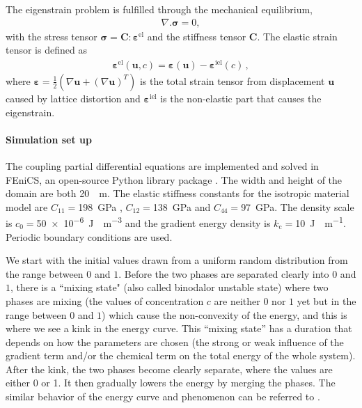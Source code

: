 \documentclass[11pt, authoryear]{elsarticle}
\begin{document}
\begin{appendix}
		The eigenstrain problem is fulfilled through the mechanical equilibrium,
		\begin{align}
			\label{eq:mech_equi}
			\nabla . \boldsymbol{\sigma} = 0,
		\end{align}
		with the stress tensor $\boldsymbol{\sigma} = \boldsymbol{C}:\boldsymbol{\varepsilon}^{\mathrm{el}}$ 
		and the stiffness tensor $\boldsymbol{C}$. The elastic strain tensor is defined as
		\begin{align}
			\label{eq:elastic_strain_tensor}
			\boldsymbol{\varepsilon}^{\mathrm{el}}(\boldsymbol{u}, c) = \boldsymbol{\varepsilon}(\boldsymbol{u}) - \boldsymbol{\varepsilon}^{\mathrm{iel}}(c)\,,
		\end{align}
		where $\boldsymbol{\varepsilon} = \frac{1}{2}(\nabla \boldsymbol{u} + (\nabla \boldsymbol{u})^T)$ is the total strain tensor from displacement $\boldsymbol{u}$ caused by lattice distortion and  $\boldsymbol{\varepsilon}^{\mathrm{iel}}$ is the non-elastic part that causes the eigenstrain.
		
		\paragraph{Simulation set up}
		The coupling partial differential equations are implemented and solved in FEniCS, an open-source Python library package \citep{LangtangenLogg2017}. The width and height of the domain are both \SI{20}{\mu\m}. The elastic stiffness constants for the isotropic material model are $C_\mathrm{11}=$\SI{198}{\GPa} , $C_\mathrm{12}=$\SI{138}{\GPa} and $C_\mathrm{44}=$\SI{97}{\GPa}. The density scale is $c_\mathrm{0}=$\SI{50e-6}{\J\mu \m^{-3}} and the gradient energy density is $k_\mathrm{c}=$\SI{10}{\J\mu \m^{-1}}. Periodic boundary conditions are used.
		
		
		We start with the initial values drawn from a uniform random distribution from the range between $0$ and $1$. Before the two phases are separated clearly into $0$ and $1$, there is a “mixing state" (also called  binodalor unstable state) where two phases are mixing (the values of concentration $c$ are neither $0$ nor $1$ yet but in the range between $0$ and $1$) which cause the non-convexity of the energy, and this is where we see a kink in the energy curve. This “mixing state” has a duration that depends on how the parameters are chosen (the strong or weak influence of the gradient term and/or the chemical term on the total energy of the whole system). After the kink, the two phases become clearly separate, where the values are either 0 or 1. It then gradually lowers the energy by merging the phases. The similar behavior of the energy curve and phenomenon can be referred to \citep{kim2021unconditionally}.
		

\end{appendix}
\end{document}
